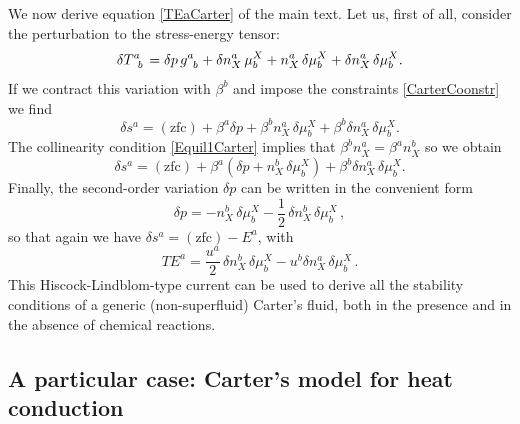 \documentclass[a4paper, amsfonts, amssymb, amsmath, reprint, showkeys, nofootinbib, twoside, onecolumn,notitlepage]{revtex4-1}
\begin{document}
We now derive equation \eqref{TEaCarter} of the main text. Let us, first of all, consider the perturbation to the stress-energy tensor:
\begin{equation}
\delta T\indices{^a _b} = \delta p \, g\indices{^a _b} + \delta n_X^a \, \mu^X_b + n_X^a \, \delta \mu^X_b + \delta n_X^a \, \delta \mu^X_b.
\end{equation}
If we contract this variation with $\beta^b$ and impose the constraints \eqref{CarterCoonstr} we find
\begin{equation}
\delta s^a =(\text{zfc}) + \beta^a \delta p + \beta^b n_X^a \, \delta \mu^X_b + \beta^b \delta n_X^a \, \delta \mu^X_b.
\end{equation} 
The collinearity condition \eqref{Equil1Carter} implies that $\beta^b n_X^a= \beta^a n_X^b$ so we obtain
\begin{equation}
\delta s^a =(\text{zfc}) + \beta^a (\delta p +  n_X^b \, \delta \mu^X_b) + \beta^b \delta n_X^a \, \delta \mu^X_b.
\end{equation}
Finally, the second-order variation $\delta p$ can be written in the convenient form
\begin{equation}
\delta p = - n_X^b \, \delta \mu^X_b - \dfrac{1}{2} \, \delta n_X^b \, \delta \mu^X_b \, ,
\end{equation}
so that again we have $\delta s^a = (\text{zfc})-E^a$, with
\begin{equation}\label{TEaCarter2}
TE^a = \dfrac{u^a}{2}  \, \delta n_X^b \, \delta \mu^X_b - u^b \delta n_X^a \, \delta \mu^X_b \, .
\end{equation}
This Hiscock-Lindblom-type current can be used to derive all the stability conditions of a generic (non-superfluid) Carter's fluid, both in the presence and in the absence of chemical reactions. 

\subsection{A particular case: Carter's model for heat conduction}
\end{document}
